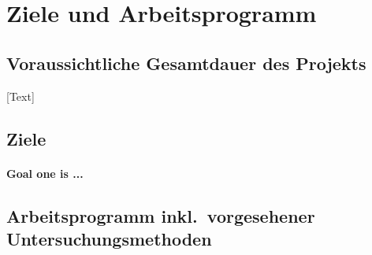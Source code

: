 \documentclass[ngerman]{scrartcl}
\begin{document}




\section{Ziele und Arbeitsprogramm}

\subsection{Voraussichtliche Gesamtdauer des Projekts}
[Text]

\subsection{Ziele}
\let\oldpara=\theparagraph
\addtocounter{secnumdepth}{1}
\renewcommand{\theparagraph}{Ziel \arabic{paragraph}}

\paragraph{\textnormal{Goal one is ...}}

\subsection{Arbeitsprogramm inkl.\ vorgesehener Untersuchungsmethoden}
\end{document}
